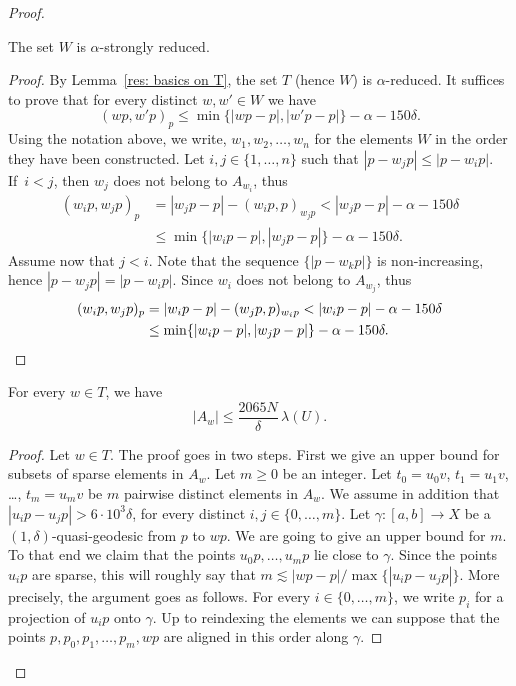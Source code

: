 \begin{proof}
\begin{lem}\label{L: construction of sub-semi-group 4}
The set $W$ is $\alpha$-strongly reduced.
\end{lem}

\begin{proof}
By Lemma~\ref{res: basics on T}, the set $T$ (hence $W$) is $\alpha$-reduced.
It suffices to prove that for every distinct $w,w' \in W$ we have
\begin{equation*}
(wp,w'p)_p \leq \min \{ |wp - p|, |w'p-p|\} - \alpha - 150\delta.
\end{equation*}
Using the notation above, we write, $w_1, w_2, \dots, w_n$ for the elements $W$ in the order they have been constructed.
Let $i,j \in \{1, \dots, n\}$ such that $|p - w_jp| \leq |p - w_ip|$.
If~$i < j$, then $w_j$ does not belong to $A_{w_i}$, thus
\begin{align*}
(w_ip, w_jp)_p
& = |w_jp-p| - (w_ip, p)_{w_jp} < |w_jp-p| - \alpha - 150\delta \\
& \leq \min \{ |w_ip - p|, |w_jp-p|\} - \alpha - 150\delta.
\end{align*}
Assume now that $j < i$.
Note that the sequence $\{|p - w_kp|\}$ is non-increasing, hence $|p - w_jp| = |p -w_ip|$.
Since $w_i$ does not belong to $A_{w_j}$, thus
\begin{align*}
(w_ip, w_jp)_p
& = |w_ip-p| - (w_jp, p)_{w_ip}
< |w_ip-p| - \alpha - 150\delta \\
& \leq \min \{ |w_ip - p|, |w_jp-p|\} - \alpha - 150\delta. \qedhere
\end{align*}
\end{proof}

\begin{lem}\label{L: construction of sub-semi-group 3}
For every $w \in T$, we have
\begin{equation*}
|A_w| \leq \frac{2065N}{\delta}\, \lambda(U).
\end{equation*}
\end{lem}

\begin{proof}
Let $w \in T$.
The proof goes in two steps.
First we give an upper bound for subsets of sparse elements in $A_w$.
Let $m \geq 0$ be an integer.
Let $t_0 = u_0v$, $t_1 = u_1v$, \dots, $t_m = u_mv$ be $m$ pairwise distinct elements in $A_w$.
We assume in addition that $|u_ip - u_jp| > 6\cdot 10^3\delta$, for every distinct $i,j \in \{0, \dots,m\}$.
Let $\gamma \colon [a,b] \to X$ be a $(1, \delta)$-quasi-geodesic from $p$ to $wp$.
We are going to give an upper bound for $m$.
To that end we claim that the points $u_0p, \dots, u_mp$ lie close to $\gamma$.
Since the points $u_ip$ are sparse, this will roughly say that $m \lesssim |wp-p| / \max\{ |u_ip - u_jp|\}$.
More precisely, the argument goes as follows.
For every $i \in \{0, \dots, m\}$, we write $p_i$ for a projection of $u_ip$ onto $\gamma$.
Up to reindexing the elements we can suppose that the points $p, p_0, p_1, \dots, p_m, wp$ are aligned in this order along $\gamma$.


\end{proof}
\end{proof}
